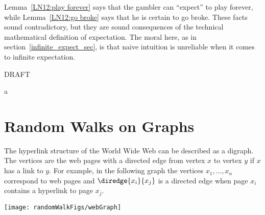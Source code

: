 Lemma~\ref{LN12:play forever} says that the gambler can ``expect'' to
play forever, while Lemma~\ref{LN12:go broke} says that he is certain
to go broke.  These facts sound contradictory, but they are sound
consequences of the technical mathematical definition of expectation.
The moral here, as in section~\ref{infinite_expect_sec}, is that naive
intuition is unreliable when it comes to infinite expectation.


\begin{problems}
\practiceproblems

\classproblems
{}

\begin{editingnotes}
\homeworkproblems

DRAFT

\end{editingnotes}

a%
\end{problems}


\section{Random Walks on Graphs}\label{Google_sec}

\begin{editingnotes}


\end{editingnotes}

The hyperlink structure of the World Wide Web can be described as a
digraph.  The vertices are the web pages with a directed edge from vertex
$x$ to vertex $y$ if $x$ has a link to $y$.  For example, in the following
graph the vertices $x_1, \ldots, x_n$ correspond to web pages and
$\diredge{x_i}{x_j}$ is a directed edge when page $x_i$ contains a
hyperlink to page $x_j$.

\texttt{[image: randomWalkFigs/webGraph]}

